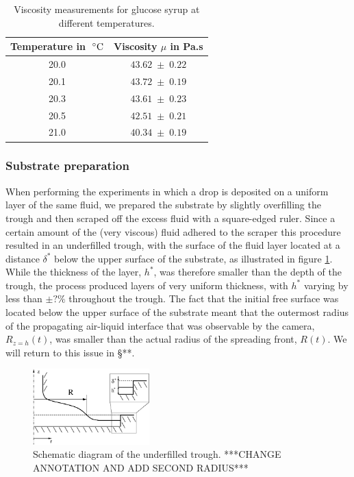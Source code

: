 \documentclass[aip,graphicx]{revtex4-1}
\begin{document}
{\renewcommand{\arraystretch}{1.2}
 \begin{table}[!ht]
 \begin{center}
 \begin{tabular}{c | c}
  Temperature in $\; ^{\circ} \text{C}$ & Viscosity $\mu$ in Pa.s \\ \hline 20.0 &
  $43.62 \; \pm \; 0.22$ \\ 20.1 & $43.72 \; \pm \; 0.19$ \\ 20.3 &
  $43.61 \; \pm \; 0.23$ \\ 20.5 & $42.51 \; \pm \; 0.21$ \\ 21.0 &
  $40.34 \; \pm \; 0.19$\\
 \end{tabular}
 \caption{Viscosity measurements for glucose syrup at different
   temperatures.}
 \label{tab:glucose_viscosity}
 \end{center}
 \end{table}}


\subsubsection{Substrate preparation\label{sec:creating_layer}}
When performing the experiments in which a drop is 
deposited on a uniform layer of the same fluid, we prepared the
substrate by slightly overfilling the trough and then scraped 
off the excess fluid with a 
square-edged ruler. Since a certain amount of the (very viscous) fluid 
adhered to the scraper this procedure resulted in an underfilled trough, 
with the surface of the fluid layer located at a distance $\delta^*$ 
below the upper surface of the substrate, as illustrated in figure 
\ref{fig:axisym_drop_nozzle_gap}. While the thickness of the layer, 
$h^*$, was therefore smaller than the depth of the trough, the
process produced layers of very uniform thickness, with
$h^*$ varying by less than {\bf $\pm ?\%$} throughout the trough. 
The fact that the initial free surface was located below the
upper surface of the substrate meant that the outermost radius
of the propagating air-liquid interface that was observable by the camera,
$R_{z=h}(t)$, was smaller than the actual radius of the spreading front,
 $R(t)$. We will return to this issue in \S ***.

\begin{figure}[!ht]
\centering
\includegraphics[width=0.4\textwidth]{figures/axisym_drop_nozzle_gap.eps}
\caption{Schematic diagram of the underfilled trough. ***CHANGE
  ANNOTATION AND ADD SECOND RADIUS***}
\label{fig:axisym_drop_nozzle_gap}
\end{figure}
 
\end{document}
